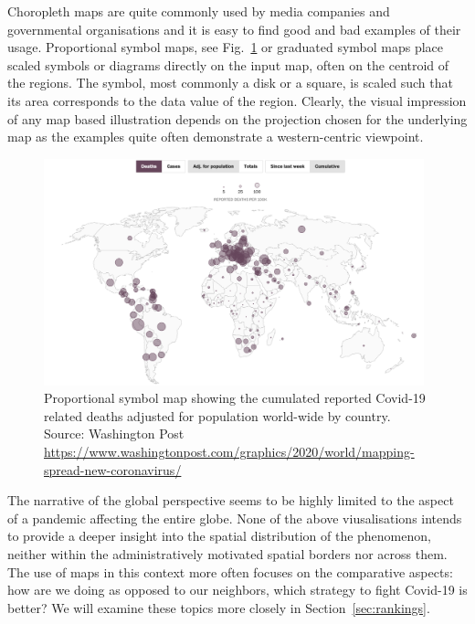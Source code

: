 \documentclass[article]{jdssv}\usepackage[]{graphicx}\usepackage[]{color}
\begin{document}
Choropleth maps are quite commonly used by media companies and governmental organisations and it is easy to find good and bad examples of their usage. Proportional symbol maps, see Fig.~\ref{fig:propsymb} or graduated symbol maps place scaled symbols or diagrams directly on the input map, often on the centroid of the regions. The symbol, most commonly a disk or a square, is scaled such that its area corresponds to the data value of the region. 
Clearly, the visual impression of any map based illustration depends on the projection chosen for the underlying map as the examples quite often demonstrate a western-centric viewpoint.


\begin{figure}
	\includegraphics[width = 0.98\textwidth]{Figures_Web/wp_totaldeaths_propsymb.png}
	\caption{Proportional symbol map showing the cumulated reported Covid-19 related deaths adjusted for population world-wide by country. Source: Washington Post \url{https://www.washingtonpost.com/graphics/2020/world/mapping-spread-new-coronavirus/}}
	\label{fig:propsymb}
\end{figure}

The narrative of the global perspective seems to be highly limited to the aspect of a pandemic affecting the entire globe. None of the above viusalisations intends to provide a deeper insight into the spatial distribution of the phenomenon, neither within the administratively motivated spatial borders nor across them. The use of maps in this context more often focuses on the comparative aspects: how are we doing as opposed to our neighbors, which strategy to fight Covid-19 is better? We will examine these topics more closely in Section~\ref{sec:rankings}.
\end{document}
